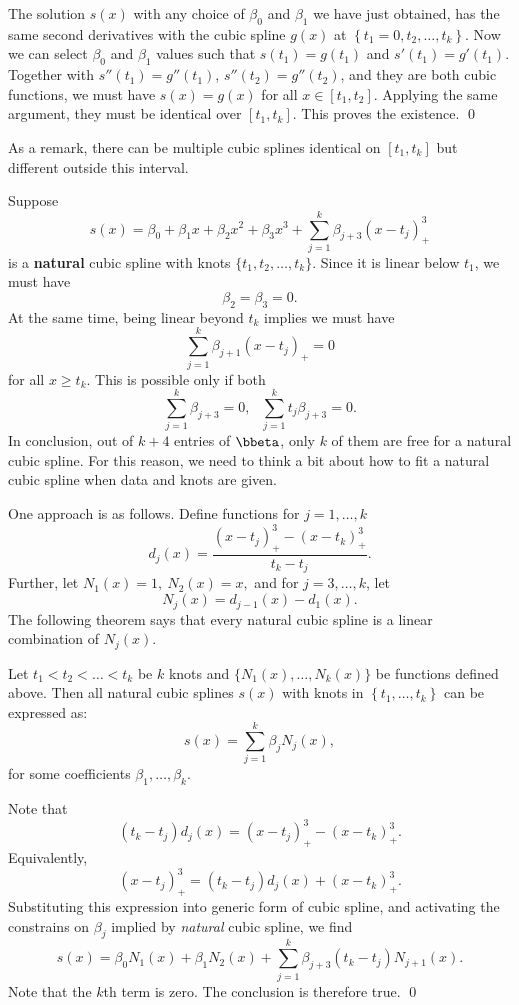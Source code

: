 The solution $s(x)$ with any choice of $\beta_0$
and $\beta_1$ we have just obtained, has the
same second derivatives with the cubic spline
$g(x)$ at $\left \{t_1=0, t_2, \ldots, t_k \right\}$.
Now we can select $\beta_0$ and $\beta_1$ values
such that $s(t_1) = g(t_1)$ and $s'(t_1) = g'(t_1)$. 
Together with $s''(t_1) = g''(t_1)$, $s''(t_2) = g''(t_2)$,
and they are both cubic functions,
we must have $s(x) = g(x)$ for all $x \in [t_1, t_2]$. 
Applying the same argument,
they must be identical over $[t_1, t_k]$. 
This proves the existence.
\qed

\vs\vs
As a remark, there can be multiple cubic splines identical on 
$[t_1, t_k]$ but different outside this interval.
 
Suppose
\[
s(x)
=\beta_0+\beta_1x+\beta_2 x^2+\beta_3 x^3 
+ \sum_{j=1}^{k}\beta_{j+3} (x-t_j)_+^3
\]
is a {\bf natural} cubic spline with knots $\{t_1, t_2, \ldots, t_k\}$.
Since it is linear below $t_1$, we must have
\[
\beta_2 = \beta_3=0.
\]
At the same time, being linear beyond $t_k$ implies we must have
\[
\sum_{j=1}^k \beta_{j+1} (x - t_j)_+ =0
\]
for all $x \geq t_k$. This is possible only if both
\[
\sum_{j=1}^k \beta_{j+3} = 0, ~~~ \sum_{j=1}^k t_j \beta_{j+3} = 0.
\]
In conclusion, out of $k+4$ entries of $\bbeta$, only
$k$ of them are free for a natural cubic spline.
For this reason, we need to think a bit about how to fit
a natural cubic spline when data and knots are given.

One approach is as follows. Define functions for $j=1, \ldots, k$
\[
d_{j}(x)
=\frac{(x-t_{j})_+^3 - (x-t_{k})_+^3}{t_{k}-t_{j}}.
\]
Further, let $N_1(x)=1, ~ N_2(x)=x,$
and for $j=3, \ldots, k$, let
\[
N_{j}(x) = d_{j-1}(x) - d_{1}(x).
\]
The following theorem says that every 
natural cubic spline 
is a linear combination of $N_j(x)$.

\begin{theorem}
Let $t_1 < t_2 < \ldots < t_k$ be $k$ knots and
$\{N_1(x), \ldots, N_k(x)\}$ be functions defined above.
Then all natural cubic splines $s(x)$ with knots in  $\left\{t_1, \ldots, t_k \right\}$
can be expressed as: 
\[
s(x)=\sum_{j=1}^{k} \beta_j N_j(x),
\]
for some coefficients $\beta_1,\ldots,\beta_{k}$. 
\end{theorem}

\vs
\proof

Note that 
\[
(t_k - t_j) d_{j}(x) = (x-t_{j})_+^3 - (x-t_{k})_+^3.
\]
Equivalently,
\[
(x-t_{j})_+^3 = (t_k - t_j) d_{j}(x)+ (x-t_{k})_+^3.
\]
Substituting this expression into generic form of
cubic spline, and activating the constrains on $\beta_j$
implied by {\it natural} cubic spline, we find
\[
s(x) 
= \beta_0 N_1(x) + \beta_1 N_2(x) +
\sum_{j=1}^{k} \beta_{j+3} (t_k - t_j) N_{j+1}(x).
\]
Note that the $k$th term is zero.
The conclusion is therefore true.
\qed

